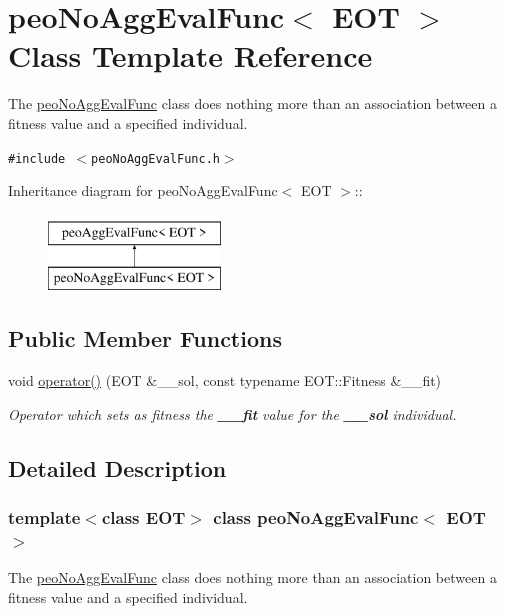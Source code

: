 \hypertarget{classpeoNoAggEvalFunc}{
\section{peo\-No\-Agg\-Eval\-Func$<$ EOT $>$ Class Template Reference}
\label{classpeoNoAggEvalFunc}
}
The \hyperlink{classpeoNoAggEvalFunc}{peo\-No\-Agg\-Eval\-Func} class does nothing more than an association between a fitness value and a specified individual.  


{\tt \#include $<$peo\-No\-Agg\-Eval\-Func.h$>$}

Inheritance diagram for peo\-No\-Agg\-Eval\-Func$<$ EOT $>$::\begin{figure}[H]
\begin{center}
\leavevmode
\includegraphics[height=2cm]{classpeoNoAggEvalFunc}
\end{center}
\end{figure}
\subsection*{Public Member Functions}
\begin{CompactItemize}
\item 
void \hyperlink{classpeoNoAggEvalFunc_1a69ee1af8745ac75c864bf884436de5}{operator()} (EOT \&\_\-\_\-sol, const typename EOT::Fitness \&\_\-\_\-fit)
\begin{CompactList}\small\item\em Operator which sets as fitness the {\bf \_\-\_\-fit} value for the {\bf \_\-\_\-sol} individual. \item\end{CompactList}\end{CompactItemize}


\subsection{Detailed Description}
\subsubsection*{template$<$class EOT$>$ class peo\-No\-Agg\-Eval\-Func$<$ EOT $>$}

The \hyperlink{classpeoNoAggEvalFunc}{peo\-No\-Agg\-Eval\-Func} class does nothing more than an association between a fitness value and a specified individual. 

